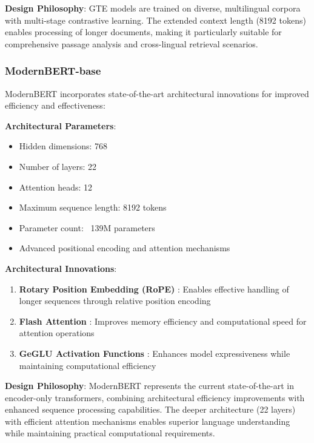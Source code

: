\textbf{Design Philosophy}: GTE models are trained on diverse, multilingual corpora with multi-stage contrastive learning. The extended context length (8192 tokens) enables processing of longer documents, making it particularly suitable for comprehensive passage analysis and cross-lingual retrieval scenarios.

\subsubsection{ModernBERT-base}

ModernBERT \cite{modernbert} incorporates state-of-the-art architectural innovations for improved efficiency and effectiveness:

\textbf{Architectural Parameters}:
\begin{itemize}
    \item Hidden dimensions: 768
    \item Number of layers: 22
    \item Attention heads: 12
    \item Maximum sequence length: 8192 tokens
    \item Parameter count: ~139M parameters
    \item Advanced positional encoding and attention mechanisms
\end{itemize}

\textbf{Architectural Innovations}:
\begin{enumerate}
    \item \textbf{Rotary Position Embedding (RoPE)} \cite{su2023roformerenhancedtransformerrotary}: Enables effective handling of longer sequences through relative position encoding
    \item \textbf{Flash Attention} \cite{dao2022flashattentionfastmemoryefficientexact}: Improves memory efficiency and computational speed for attention operations
    \item \textbf{GeGLU Activation Functions} \cite{shazeer2020gluvariantsimprovetransformer}: Enhances model expressiveness while maintaining computational efficiency
\end{enumerate}

\textbf{Design Philosophy}: ModernBERT represents the current state-of-the-art in encoder-only transformers, combining architectural efficiency improvements with enhanced sequence processing capabilities. The deeper architecture (22 layers) with efficient attention mechanisms enables superior language understanding while maintaining practical computational requirements.


